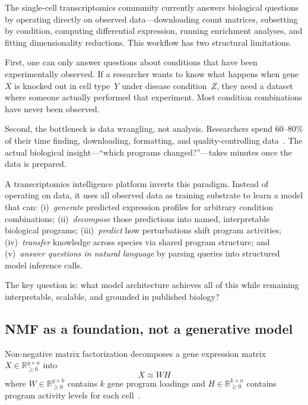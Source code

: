 \documentclass[10pt,twocolumn,letterpaper]{article}
\begin{document}
The single-cell transcriptomics community currently answers biological questions
by operating directly on observed data---downloading count matrices, subsetting by
condition, computing differential expression, running enrichment analyses, and
fitting dimensionality reductions. This workflow has two structural limitations.

First, one can only answer questions about conditions that have been
experimentally observed. If a researcher wants to know what happens when gene~$X$
is knocked out in cell type~$Y$ under disease condition~$Z$, they need a dataset
where someone actually performed that experiment. Most condition combinations
have never been observed.

Second, the bottleneck is data wrangling, not analysis. Researchers spend
60--80\% of their time finding, downloading, formatting, and quality-controlling
data~\citep{zheng2017massively}. The actual biological insight---``which programs
changed?''---takes minutes once the data is prepared.

A transcriptomics intelligence platform inverts this paradigm. Instead of
operating on data, it uses all observed data as training substrate to learn a
model that can: (i)~\emph{generate} predicted expression profiles for arbitrary
condition combinations; (ii)~\emph{decompose} those predictions into named,
interpretable biological programs; (iii)~\emph{predict} how perturbations shift
program activities; (iv)~\emph{transfer} knowledge across species via shared
program structure; and (v)~\emph{answer questions in natural language} by parsing
queries into structured model inference calls.

The key question is: what model architecture achieves all of this while remaining
interpretable, scalable, and grounded in published biology?

\subsection{NMF as a foundation, not a generative model}

Non-negative matrix factorization decomposes a gene expression matrix
$X \in \mathbb{R}_{\geq 0}^{g \times n}$ into
\begin{equation}
  X \approx WH
  \label{eq:nmf}
\end{equation}
where $W \in \mathbb{R}_{\geq 0}^{g \times k}$ contains $k$ gene program
loadings and $H \in \mathbb{R}_{\geq 0}^{k \times n}$ contains program activity
levels for each cell~\citep{lee1999learning,debruine2021rcppml}.
\end{document}
